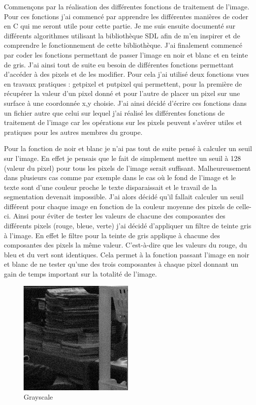 \documentclass[12pt]{report}
\begin{document}
Commençons par la réalisation des différentes fonctions de traitement de l’image.
Pour ces fonctions j’ai commencé par apprendre les différentes manières de coder en C qui me seront utile pour cette partie. Je me suis ensuite documenté sur différents algorithmes utilisant la bibliothèque SDL afin de m’en inspirer et de comprendre le fonctionnement de cette bibliothèque. J’ai finalement commencé par coder les fonctions permettant de passer l’image en noir et blanc et en teinte de gris. J’ai ainsi tout de suite eu besoin de différentes fonctions permettant d’accéder à des pixels et de les modifier. Pour cela j’ai utilisé deux fonctions vues en travaux pratiques : getpixel et putpixel qui permettent, pour la première de récupérer la valeur d’un pixel donné et pour l’autre de placer un pixel sur une surface à une coordonnée x,y choisie. J’ai ainsi décidé d’écrire ces fonctions dans un fichier autre que celui sur lequel j’ai réalisé les différentes fonctions de traitement de l’image car les opérations sur les pixels peuvent s’avérer utiles et pratiques pour les autres membres du groupe.

\newpage

Pour la fonction de noir et blanc je n’ai pas tout de suite pensé à calculer un seuil sur l’image. En effet je pensais que le fait de simplement mettre un seuil à 128 (valeur du pixel) pour tous les pixels de l’image serait suffisant. Malheureusement dans plusieurs cas comme par exemple dans le cas où le fond de l’image et le texte sont d’une couleur proche le texte disparaissait et le travail de la segmentation devenait impossible. J’ai alors décidé qu’il fallait calculer un seuil différent pour chaque image en fonction de la couleur moyenne des pixels de celle-ci. Ainsi pour éviter de tester les valeurs de chacune des composantes des différents pixels (rouge, bleue, verte) j’ai décidé d’appliquer un filtre de teinte gris à l’image. En effet le filtre pour la teinte de gris applique à chacune des composantes des pixels la même valeur. C’est-à-dire que les valeurs du rouge, du bleu et du vert sont identiques. Cela permet à la fonction passant l’image en noir et blanc de ne tester qu’une des trois composantes à chaque pixel donnant un gain de temps important sur la totalité de l’image. 

\begin{figure}[H]
    \centering
    \includegraphics[width=0.5\textwidth]{grayscale}
    \caption{Grayscale}
\end{figure}
\end{document}
